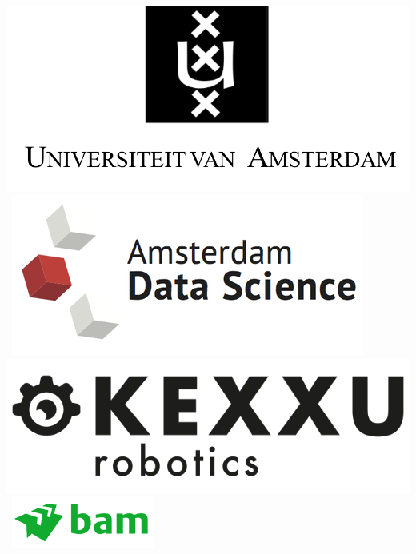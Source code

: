 \begin{titlepage}

\bigskip

\begin{center}
\mbox{
    \includegraphics[width=.2\paperwidth]{titlepage/logo-uva.png} 
    \includegraphics[width=.2\paperwidth]{titlepage/ads.png}
}
\mbox{
    \includegraphics[width=.2\paperwidth]{titlepage/kexxu.png}
    \includegraphics[width=.2\paperwidth]{titlepage/bam.png}
}
\end{center}
\end{titlepage}

%
%
%
